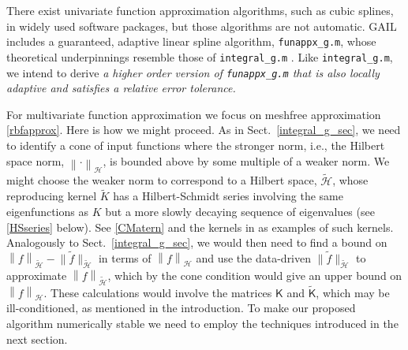 \documentclass[11pt]{NSFamsart}
\newcommand{\tf}{\tilde{f}}
\newcommand{\mK}{\mathsf{K}}
\newcommand{\tmK}{\widetilde{\mathsf{K}}}
\newcommand{\norm}[2][{}]{\ensuremath{\left \lVert #2 \right \rVert}_{#1}}
\newcommand{\ch}{\mathcal{H}}
\newcommand{\tch}{{\widetilde{\ch}}}
\newcommand{\tK}{\widetilde{K}}
\begin{document}
\begin{description}[leftmargin=2.5ex]
There exist univariate function approximation algorithms, such as cubic splines, in widely used software packages, but those algorithms are not automatic.  GAIL \citep{ChoEtal14a} includes a guaranteed, adaptive linear spline algorithm, {\tt funappx\_g.m}, whose theoretical underpinnings resemble those of {\tt integral\_g.m} \citep{HicEtal14b}.  Like {\tt integral\_g.m}, we intend to derive \emph{a higher order version of {\tt funappx\_g.m} that is also locally adaptive and satisfies a relative error tolerance.}

For multivariate function approximation we focus on meshfree approximation \eqref{rbfapprox}.  Here is how we might proceed.  As in Sect.\ \ref{integral_g_sec}, we need to identify a cone of input functions where the stronger norm, i.e., the Hilbert space norm, $\norm[\ch]{\cdot}$, is bounded above by some multiple of a weaker norm.  We might choose the weaker norm to correspond to a Hilbert space, $\tch$, whose reproducing kernel $\tK$ has a Hilbert-Schmidt series involving the same eigenfunctions as $K$ but a more slowly decaying sequence of eigenvalues (see \eqref{HSseries} below). See \eqref{CMatern} and the kernels in \citep[Chap.\ 2]{Wah90} as examples of such kernels.  Analogously to Sect.\ \ref{integral_g_sec}, we would then need to find a bound on $\norm[\tch]{f} - \bigl\lVert \tf \bigr \rVert_{\tch}$ in terms of $\norm[\ch]{f}$ and use the data-driven $\bigl\lVert \tf \bigr \rVert_{\tch}$ to approximate $\norm[\tch]{f}$, which by the cone condition would give an upper bound on $\norm[\ch]{f}$. These calculations would involve the matrices $\mK$ and $\tmK$, which may be ill-conditioned, as mentioned in the introduction.  To make our proposed algorithm numerically stable we need to employ the techniques introduced in the next section.



\end{description}


\newpage
\clearpage
{}



\renewcommand{\refname}{\hfill \textbf{\large References Cited} \hfill \hfill}                   %
\renewcommand{\bibliofont}{\normalsize}


\end{document}
